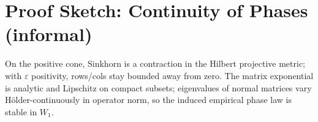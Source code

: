 \documentclass[11pt]{article}
\theoremstyle{remark}
\begin{document}
\section{Proof Sketch: Continuity of Phases (informal)}
On the positive cone, Sinkhorn is a contraction in the Hilbert projective metric; with $\varepsilon$ positivity, rows/cols stay bounded away from zero. The matrix exponential is analytic and Lipschitz on compact subsets; eigenvalues of normal matrices vary Hölder-continuously in operator norm, so the induced empirical phase law is stable in $W_1$.
\end{document}
